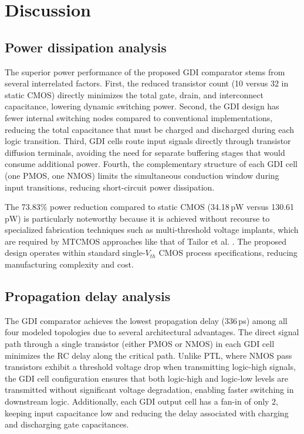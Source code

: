 \documentclass[final,5p,times,twocolumn]{elsarticle}
\begin{document}
\section{Discussion}
\label{sec:discussion}

\subsection{Power dissipation analysis}

The superior power performance of the proposed GDI comparator stems from several interrelated factors. First, the reduced transistor count (10 versus 32 in static CMOS) directly minimizes the total gate, drain, and interconnect capacitance, lowering dynamic switching power. Second, the GDI design has fewer internal switching nodes compared to conventional implementations, reducing the total capacitance that must be charged and discharged during each logic transition. Third, GDI cells route input signals directly through transistor diffusion terminals, avoiding the need for separate buffering stages that would consume additional power. Fourth, the complementary structure of each GDI cell (one PMOS, one NMOS) limits the simultaneous conduction window during input transitions, reducing short-circuit power dissipation.

The 73.83\% power reduction compared to static CMOS (34.18\,pW versus 130.61\,pW) is particularly noteworthy because it is achieved without recourse to specialized fabrication techniques such as multi-threshold voltage implants, which are required by MTCMOS approaches like that of Tailor et al. \cite{tailor2019}. The proposed design operates within standard single-$V_{th}$ CMOS process specifications, reducing manufacturing complexity and cost.

\subsection{Propagation delay analysis}

The GDI comparator achieves the lowest propagation delay (336\,ps) among all four modeled topologies due to several architectural advantages. The direct signal path through a single transistor (either PMOS or NMOS) in each GDI cell minimizes the RC delay along the critical path. Unlike PTL, where NMOS pass transistors exhibit a threshold voltage drop when transmitting logic-high signals, the GDI cell configuration ensures that both logic-high and logic-low levels are transmitted without significant voltage degradation, enabling faster switching in downstream logic. Additionally, each GDI output cell has a fan-in of only 2, keeping input capacitance low and reducing the delay associated with charging and discharging gate capacitances.
\end{document}
